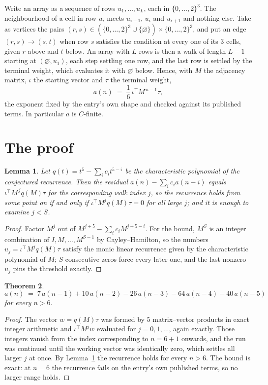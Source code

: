 \documentclass[11pt,a4paper]{article}
\theoremstyle{plain}
\newtheorem{theorem}{Theorem}
\newtheorem{lemma}[theorem]{Lemma}
\theoremstyle{definition}
\begin{document}
Write an array as a sequence of rows $u_1,\dots,u_L$, each in
$\{0,\dots,2\}^{3}$. The neighbourhood of a cell in row $u_i$ meets $u_{i-1}$,
$u_i$ and $u_{i+1}$ and nothing else. Take as vertices the pairs
$(r,s)\in(\{0,\dots,2\}^{3}\cup\{\varnothing\})\times\{0,\dots,2\}^{3}$,
and put an edge $(r,s)\to(s,t)$ when row $s$ satisfies the condition at every one of its
$3$ cells, given $r$ above and $t$ below. An array with $L$ rows is then a walk of length
$L-1$ starting at $(\varnothing,u_1)$, each step settling one row, and the last row is
settled by the terminal weight, which evaluates it with $\varnothing$ below. Hence,
with $M$ the adjacency matrix, $\iota$ the starting vector and $\tau$ the terminal weight,
\[
a(n)\;=\;\frac{1}{6}\,\iota^{\!\top}M^{\,n-1}\tau ,
\]
the exponent fixed by the entry's own shape and checked against its published terms. In
particular $a$ is $C$-finite.

\section{The proof}

\begin{lemma}\label{lem:crit}
Let $q(t)=t^{5}-\sum_i c_it^{5-i}$ be the characteristic polynomial of the
conjectured recurrence. Then the residual $a(n)-\sum_ic_ia(n-i)$ equals
$\iota^{\!\top}M^{\,j}q(M)\tau$ for the corresponding walk index $j$, so the
recurrence holds from some point on if and only if $\iota^{\!\top}M^{j}q(M)\tau=0$ for all
large $j$; and it is enough to examine $j<S$.
\end{lemma}

\begin{proof}
Factor $M^{j}$ out of $M^{j+5}-\sum_ic_iM^{j+5-i}$. For the bound, $M^{S}$
is an integer combination of $I,M,\dots,M^{S-1}$ by Cayley--Hamilton, so the numbers
$u_j=\iota^{\!\top}M^{j}q(M)\tau$ satisfy the monic linear recurrence given by the
characteristic polynomial of $M$; $S$ consecutive zeros force every later one, and the last
nonzero $u_j$ pins the threshold exactly.
\end{proof}

\begin{theorem}
\[
a(n)\;=\;7\,a(n-1) + 10\,a(n-2) - 26\,a(n-3) - 64\,a(n-4) - 40\,a(n-5)
\]
for every $n>6$.
\end{theorem}

\begin{proof}
The vector $w=q(M)\tau$ was formed by $5$ matrix--vector products in exact integer
arithmetic and $\iota^{\!\top}M^{j}w$ evaluated for $j=0,1,\dots$, again exactly. Those
integers vanish from the index corresponding to $n=6+1$ onwards, and the run was
continued until the working vector was identically zero, which settles all larger $j$ at once.
By Lemma~\ref{lem:crit} the recurrence holds for every $n>6$. The bound is exact: at $n=6$ the recurrence fails on the entry's own published terms, so no larger range holds.
\end{proof}
\end{document}
